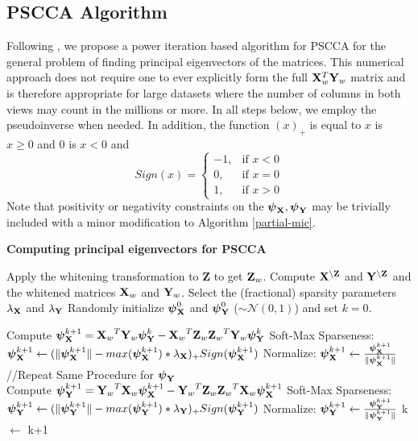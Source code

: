 \documentclass{llncs}
\newcommand{\X}{{\bf X}}
\newcommand{\Y}{{\bf Y}}
\newcommand{\Z}{{\bf Z}}
\newcommand{\bs}{\boldsymbol}
\begin{document}
\subsection{PSCCA Algorithm}
Following \cite{golub}, we propose a power iteration based algorithm
for PSCCA for the general problem of finding principal eigenvectors of
the matrices.  This numerical approach does not require one to ever
explicitly form the full $\X_{w}^T \Y_{w}$ matrix and is therefore
appropriate for large datasets where the number of columns in both views may
count in the millions or more.  In all steps below, we employ the
pseudoinverse when needed.  In addition, the function $(x)_+$ is equal to $x$ is $x \geq 0$ and $0$ is $x <0$ and 
 \begin{equation}
Sign(x)= \begin{cases} -1, & \mbox{if } x<0 \\0, & \mbox{if } x=0 \\1, & \mbox{if } x>0 \end{cases}
\end{equation}
Note that positivity or negativity constraints on the
$\bs\psi_{\X}, \bs\psi_{\Y}$ may be trivially included with a minor
modification to Algorithm \ref{partial-mic}.
\begin{algorithm}[htdp]
\small \caption{\bf Computing principal eigenvectors for PSCCA}
\label{partial-mic}
\begin{algorithmic}[1]
\STATE Apply the whitening transformation to {\Z} to get $\Z_{w}$.
\STATE Compute $\X^{\backslash \Z}$ and $\Y^{\backslash \Z}$ and the whitened matrices $\X_{w}$ and $\Y_{w}$. 
\STATE Select the (fractional) sparsity parameters $\lambda_{\X}$ and $\lambda_{\Y}$
\STATE Randomly initialize $\bs \psi_{\X}^0$ and $\bs \psi_{\Y}^0$ ($\sim \mathcal{N}(0,1)$) and set $k=0$.

\WHILE {$\Delta$ Corr($\bs X_w \bs \psi_{\X}^{k+1}$, $\bs Y_w \bs \psi_{\Y}^{k+1}$) $<$ $\epsilon$}
\STATE Compute  $\bs \psi_{\X}^{k+1}= {\X_w}^T {\Y_w} \bs \psi_{\Y}^{k} -  {\X_w}^T  {\Z_w} {\Z_w}^T {\Y_w} \bs \psi_{\Y}^{k}$
\STATE Soft-Max Sparseness:  $\bs \psi_{\X}^{k+1} \leftarrow (\|\bs \psi_{\X}^{k+1}\|  - max(\bs \psi_{\X}^{k+1})*\lambda_{\X})_+ Sign(\bs \psi_{\X}^{k+1})$
\STATE Normalize: $\bs \psi_{\X}^{k+1} \leftarrow \frac{\bs \psi_{\X}^{k+1}}{\|\bs \psi_{\X}^{k+1}\|}$\\
//Repeat Same Procedure for $\bs \psi_{\Y}$ \\
\STATE Compute  $\bs \psi_{\Y}^{k+1}= {\Y_w}^T {\X_w} \bs \psi_{\X}^{k+1} -  {\Y_w}^T  {\Z_w} {\Z_w}^T {\X_w} \bs \psi_{\X}^{k+1}$
\STATE Soft-Max Sparseness: $\bs \psi_{\Y}^{k+1} \leftarrow (\|\bs \psi_{\Y}^{k+1}\|  - max(\bs \psi_{\Y}^{k+1})*\lambda_{\Y})_+ Sign(\bs \psi_{\Y}^{k+1})$
\STATE Normalize: $\bs \psi_{\Y}^{k+1} \leftarrow \frac{\bs \psi_{\Y}^{k+1}}{\|\bs \psi_{\Y}^{k+1}\|}$
\STATE k $\leftarrow$ k+1
\ENDWHILE
\end{algorithmic}
\end{algorithm}
\end{document}
